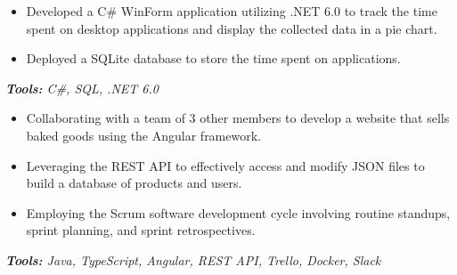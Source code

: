 \documentclass[10pt,letter]{altacv}
\begin{document}

\begin{fullwidth}
\makecvheader
\end{fullwidth}


\medskip


\begin{itemize}
  \item Developed a C\# WinForm application utilizing .NET 6.0 to track the time spent on desktop applications and display the collected data in a pie chart.
  \item Deployed a SQLite database to store the time spent on applications.
\end{itemize}
\textit{\textbf{Tools:} C\#, SQL, .NET 6.0}

\divider

\begin{itemize}
  \item Collaborating with a team of 3 other members to develop a website that sells baked goods using the Angular framework.
  \item Leveraging the REST API to effectively access and modify JSON files to build a database of products and users.
  \item Employing the Scrum software development cycle involving routine standups, sprint planning, and sprint retrospectives.
\end{itemize}
\textit{\textbf{Tools:} Java, TypeScript, Angular, REST API, Trello, Docker, Slack}
\end{document}
